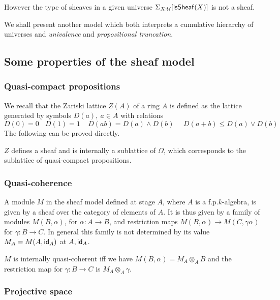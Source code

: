     \medskip

    However the type of sheaves in a given universe $\Sigma_{X:\mathcal{U}}[\mathsf{isSheaf}(X)]$ is not a sheaf.

    We shall present another model which both interprets a cumulative hierarchy of universes
    and {\em univalence} and {\em propositional truncation}.

    \subsection{Some properties of the sheaf model}

    \subsubsection{Quasi-compact propositions}

    We recall \cite{lombardi-quitte}
    that the Zariski lattice $Z(A)$ of a ring $A$ is defined as the lattice generated by symbols $D(a),~a\in A$
    with relations
    $$
    D(0) = 0~~~~D(1) = 1~~~~~D(ab) = D(a)\wedge D(b)~~~~~~D(a+b)\leqslant D(a)\vee D(b)
    $$
    The following can be proved directly.

    \begin{proposition}
      $Z$ defines a sheaf and is internally a sublattice of $\Omega$, which corresponds to the sublattice of quasi-compact
      propositions.
    \end{proposition}
    
    \subsubsection{Quasi-coherence}

A module $M$ in the sheaf model defined at stage $A$, where $A$ is a f.p.\@ $k$-algebra, is given by a sheaf over the category
of elements of $A$. It is thus given by a family of modules $M(B,\alpha)$, for $\alpha:A\rightarrow B$, and restriction maps
$M(B,\alpha)\rightarrow M(C,\gamma\alpha)$ for $\gamma:B\rightarrow C$. In general this family is not determined by
its value $M_A = M(A,\mathsf{id}_A)$ at $A,\mathsf{id}_A$.

\begin{proposition}
  $M$ is internally quasi-coherent iff we have $M(B,\alpha) = M_A\otimes_A B$ and the restriction map for
  $\gamma:B\rightarrow C$ is $M_A\otimes_A\gamma$.
\end{proposition}

    \subsubsection{Projective space}

